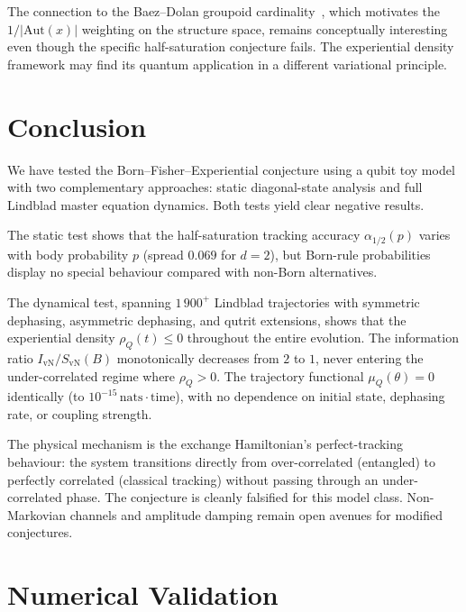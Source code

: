 \documentclass[12pt,a4paper]{article}
\newcommand{\SvN}{S_{\mathrm{vN}}}
\newcommand{\IvN}{I_{\mathrm{vN}}}
\newcommand{\rhoQ}{\rho_Q}
\newcommand{\muQ}{\mu_Q}
\newcommand{\nats}{\,\mathrm{nats}}
\begin{document}
The connection to the Baez--Dolan groupoid
cardinality~\cite{Baez2001}, which motivates the
$1/|\mathrm{Aut}(x)|$ weighting on the structure space, remains
conceptually interesting even though the specific half-saturation
conjecture fails.  The experiential density framework may find its
quantum application in a different variational principle.

\section{Conclusion}\label{sec:conclusion}

We have tested the Born--Fisher--Experiential conjecture using a
qubit toy model with two complementary approaches: static
diagonal-state analysis and full Lindblad master equation dynamics.
Both tests yield clear negative results.

The static test shows that the half-saturation tracking accuracy
$\alpha_{1/2}(p)$ varies with body probability $p$ (spread $0.069$
for $d = 2$), but Born-rule probabilities display no special
behaviour compared with non-Born alternatives.

The dynamical test, spanning $1\,900^{+}$ Lindblad trajectories
with symmetric dephasing, asymmetric dephasing, and qutrit
extensions, shows that the experiential density $\rhoQ(t) \le 0$
throughout the entire evolution.  The information ratio
$\IvN/\SvN(B)$ monotonically decreases from $2$ to $1$, never
entering the under-correlated regime where $\rhoQ > 0$.  The
trajectory functional $\muQ(\theta) = 0$ identically (to
$10^{-15}\nats\!\cdot\!\mathrm{time}$), with no dependence on
initial state, dephasing rate, or coupling strength.

The physical mechanism is the exchange Hamiltonian's
perfect-tracking behaviour: the system transitions directly from
over-correlated (entangled) to perfectly correlated (classical
tracking) without passing through an under-correlated phase.  The
conjecture is cleanly falsified for this model class.  Non-Markovian
channels and amplitude damping remain open avenues for modified
conjectures.

\appendix
\section{Numerical Validation}\label{app:validation}
\end{document}
